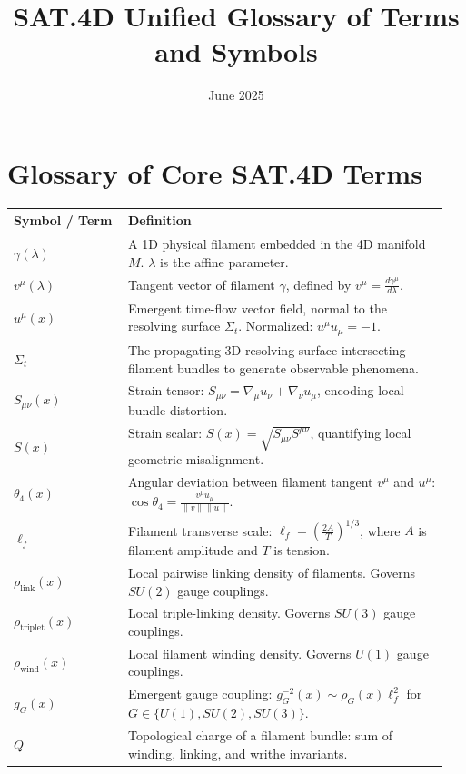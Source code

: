 \documentclass[12pt]{article}
\title{SAT.4D Unified Glossary of Terms and Symbols}
\date{June 2025}
\begin{document}
\maketitle

\section*{Glossary of Core SAT.4D Terms}

\begin{longtable}{p{0.25\linewidth} p{0.7\linewidth}}
\textbf{Symbol / Term} & \textbf{Definition} \\ \hline
$\gamma(\lambda)$ & A 1D physical filament embedded in the 4D manifold $M$. $\lambda$ is the affine parameter. \\
$v^\mu(\lambda)$ & Tangent vector of filament $\gamma$, defined by $v^\mu = \frac{d\gamma^\mu}{d\lambda}$. \\
$u^\mu(x)$ & Emergent time-flow vector field, normal to the resolving surface $\Sigma_t$. Normalized: $u^\mu u_\mu = -1$. \\
$\Sigma_t$ & The propagating 3D resolving surface intersecting filament bundles to generate observable phenomena. \\
$S_{\mu\nu}(x)$ & Strain tensor: $S_{\mu\nu} = \nabla_\mu u_\nu + \nabla_\nu u_\mu$, encoding local bundle distortion. \\
$S(x)$ & Strain scalar: $S(x) = \sqrt{S_{\mu\nu}S^{\mu\nu}}$, quantifying local geometric misalignment. \\
$\theta_4(x)$ & Angular deviation between filament tangent $v^\mu$ and $u^\mu$: $\cos\theta_4 = \frac{v^\mu u_\mu}{\lVert v\rVert \lVert u\rVert}$. \\
$\ell_f$ & Filament transverse scale: $\ell_f = \left(\frac{2A}{T}\right)^{1/3}$, where $A$ is filament amplitude and $T$ is tension. \\
$\rho_{\text{link}}(x)$ & Local pairwise linking density of filaments. Governs $SU(2)$ gauge couplings. \\
$\rho_{\text{triplet}}(x)$ & Local triple-linking density. Governs $SU(3)$ gauge couplings. \\
$\rho_{\text{wind}}(x)$ & Local filament winding density. Governs $U(1)$ gauge couplings. \\
$g_G(x)$ & Emergent gauge coupling: $g_G^{-2}(x) \sim \rho_G(x)\ell_f^2$ for $G \in \{U(1), SU(2), SU(3)\}$. \\
$Q$ & Topological charge of a filament bundle: sum of winding, linking, and writhe invariants. \\

\end{longtable}
\end{document}
